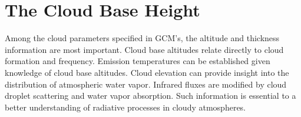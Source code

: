 \section{The Cloud Base Height}

Among the cloud parameters specified in GCM's, 
the altitude and thickness information are most
important. Cloud base altitudes 
relate directly to cloud formation and
frequency. 
%
Emission temperatures can be established given knowledge
of cloud base altitudes. Cloud elevation can provide insight into the 
distribution of atmospheric water vapor.
Infrared fluxes are modified by cloud droplet scattering and 
water vapor 
absorption.
Such information 
is essential to a better understanding of 
radiative processes in cloudy atmospheres.

